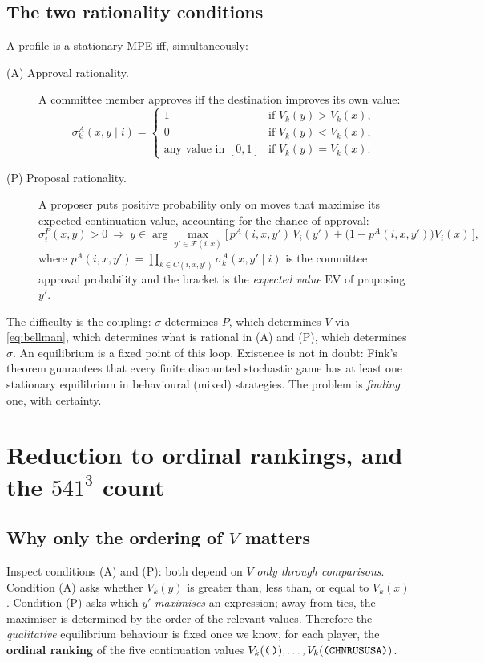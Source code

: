 \documentclass[11pt]{article}
\newcommand{\state}[1]{\texttt{(#1)}}
\newcommand{\empt}{\texttt{(\,)}}
\begin{document}
\subsection{The two rationality conditions}
A profile is a stationary MPE iff, simultaneously:
\begin{description}
\item[(A) Approval rationality.] A committee member approves iff the destination
improves its own value:
\[
\sigma^A_k(x,y\mid i) =
\begin{cases}
1 & \text{if } V_k(y) > V_k(x),\\
0 & \text{if } V_k(y) < V_k(x),\\
\text{any value in }[0,1] & \text{if } V_k(y) = V_k(x).
\end{cases}
\]
\item[(P) Proposal rationality.] A proposer puts positive probability only on moves
that maximise its expected continuation value, accounting for the chance of approval:
\[
\sigma^P_i(x,y)>0 \ \Longrightarrow\
y \in \arg\max_{y'\in\mathcal{F}(i,x)}
\Big[\,p^A(i,x,y')\,V_i(y') + \big(1-p^A(i,x,y')\big)V_i(x)\,\Big],
\]
where $p^A(i,x,y')=\prod_{k\in C(i,x,y')}\sigma^A_k(x,y'\mid i)$ is the committee
approval probability and the bracket is the \emph{expected value} $\mathrm{EV}$ of
proposing $y'$.
\end{description}
The difficulty is the coupling: $\sigma$ determines $P$, which determines $V$ via
\eqref{eq:bellman}, which determines what is rational in (A) and (P), which
determines $\sigma$. An equilibrium is a fixed point of this loop. Existence is not
in doubt: Fink's theorem guarantees that every finite discounted stochastic game has
at least one stationary equilibrium in behavioural (mixed) strategies. The problem is
\emph{finding} one, with certainty.

\section{Reduction to ordinal rankings, and the $541^3$ count}
\label{sec:ordinal}

\subsection{Why only the ordering of $V$ matters}
Inspect conditions (A) and (P): both depend on $V$ \emph{only through comparisons}.
Condition (A) asks whether $V_k(y)$ is greater than, less than, or equal to
$V_k(x)$. Condition (P) asks which $y'$ \emph{maximises} an expression; away from
ties, the maximiser is determined by the order of the relevant values. Therefore the
\emph{qualitative} equilibrium behaviour is fixed once we know, for each player, the
\textbf{ordinal ranking} of the five continuation values $V_k(\empt),\dots,
V_k(\state{CHNRUSUSA})$.
\end{document}

